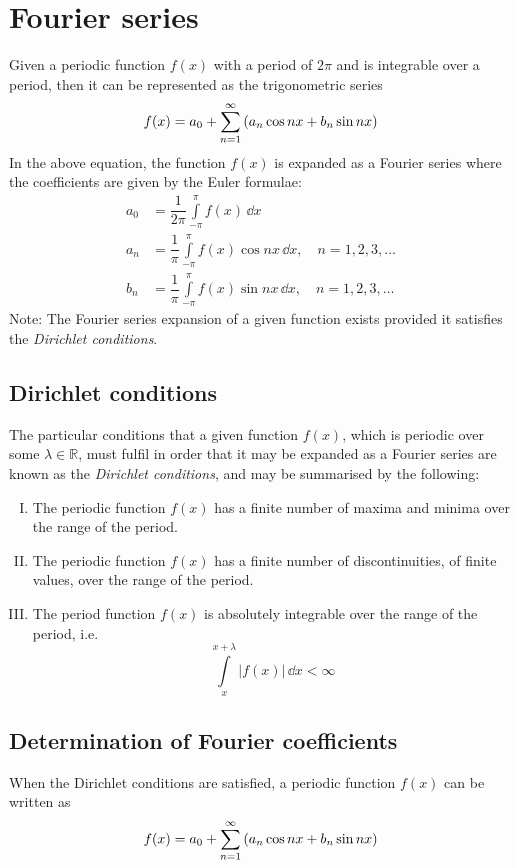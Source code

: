 \setcounter{equation}{0}
\section{Fourier series}
    Given a periodic function $f(x)$ with a period of $2\pi$ and is integrable over a period, then it can be represented as the trigonometric series
    \begin{align*}
        f(x)=a_0+\sum_{n=1}^{\infty}{\qty(a_n\cos{nx}+b_n\sin{nx})}
    \end{align*}
    In the above equation, the function $f(x)$ is expanded as a Fourier series where the coefficients are given by the Euler formulae:
    \begin{align*}
        a_0&=\dfrac{1}{2\pi}\int\limits_{-\pi}^{\pi}{f(x)\,\dd{x}} \\
        a_n&=\dfrac{1}{\pi}\int\limits_{-\pi}^{\pi}{f(x)\cos{nx}\,\dd{x}},\quad n=1,2,3,\dots \\
        b_n&=\dfrac{1}{\pi}\int\limits_{-\pi}^{\pi}{f(x)\sin{nx}\,\dd{x}},\quad n=1,2,3,\dots
    \end{align*}
    Note: The Fourier series expansion of a given function exists provided it satisfies the \textit{Dirichlet conditions}.

    \subsection{Dirichlet conditions}
        The particular conditions that a given function $f(x)$, which is periodic over some $\lambda\in\mathbb{R}$, must fulfil in order that it may be expanded as a Fourier series are known as the \textit{Dirichlet conditions}, and may be summarised by the following:
        \begin{enumerate}[I.]
            \item The periodic function $f(x)$ has a finite number of maxima and minima over the range of the period.
            \item The periodic function $f(x)$ has a finite number of discontinuities, of finite values, over the range of the period.
            \item The period function $f(x)$ is absolutely integrable over the range of the period, i.e.
            $$\int\limits_{x}^{x+\lambda}{|f(x)|\,\dd{x}}<\infty$$
        \end{enumerate}

    \subsection{Determination of Fourier coefficients}
        When the Dirichlet conditions are satisfied, a periodic function $f(x)$ can be written as
        \begin{align}
            f(x)=a_0+\sum_{n=1}^{\infty}{\qty(a_n\cos{nx}+b_n\sin{nx})} \label{eqn:fourier-series}
        \end{align}

